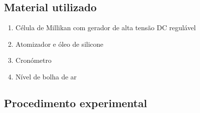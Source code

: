 \documentclass[a4paper,twoside,12pt]{article}      %
\begin{document}
\subsection{\sf Material utilizado}

\begin{enumerate}
	\item Célula de Millikan com gerador de alta tensão DC regulável
	\item  Atomizador e óleo de silicone
	\item Cronómetro
	\item Nível de bolha de ar%
\end{enumerate}
\subsection{\sf Procedimento experimental}
\end{document}
